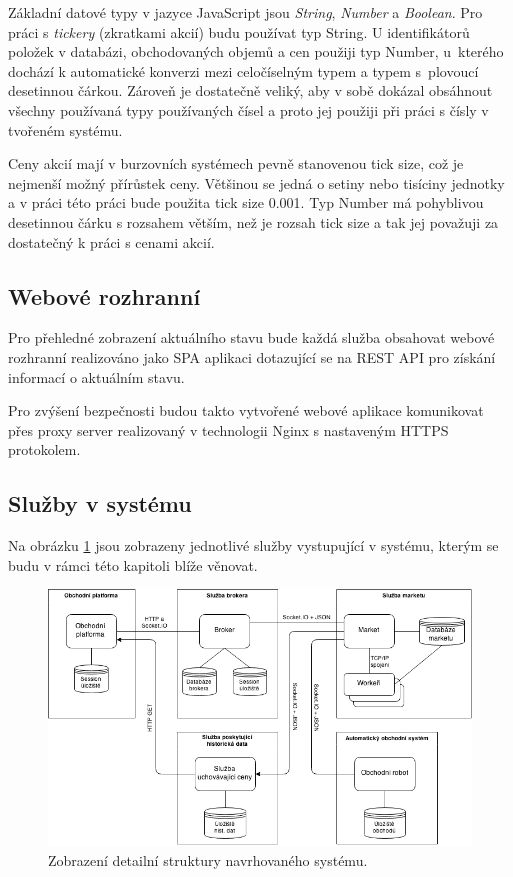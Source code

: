 \documentclass[thesis=M,czech]{FITthesis}[2012/06/26]
\begin{document}
	Základní datové typy v jazyce JavaScript jsou \textit{String}, \textit{Number} a \textit{Boolean}. Pro práci s \textit{tickery} (zkratkami akcií) budu používat typ String. U identifikátorů položek v databázi, obchodovaných objemů a cen použiji typ Number, u~kterého dochází k automatické konverzi mezi celočíselným typem a typem s~plovoucí desetinnou čárkou. Zároveň je dostatečně veliký, aby v sobě dokázal obsáhnout všechny používaná typy používaných čísel a proto jej použiji při práci s čísly v tvořeném systému.
	
	Ceny akcií mají v burzovních systémech pevně stanovenou tick size, což je nejmenší možný přírůstek ceny. Většinou se jedná o setiny nebo tisíciny jednotky a v práci této práci bude použita tick size 0.001. Typ Number má pohyblivou desetinnou čárku s rozsahem větším, než je rozsah tick size a tak jej považuji za dostatečný k práci s cenami akcií.

\subsection{Webové rozhranní}
	
	Pro přehledné zobrazení aktuálního stavu bude každá služba obsahovat webové rozhranní realizováno jako SPA aplikaci dotazující se na REST API pro získání informací o aktuálním stavu.
	
	Pro zvýšení bezpečnosti budou takto vytvořené webové aplikace komunikovat přes proxy server realizovaný v technologii Nginx s nastaveným HTTPS protokolem.

\subsection{Služby v systému}
\label{sec:system_structure}

	Na obrázku \ref{fig:system_structure} jsou zobrazeny jednotlivé služby vystupující v systému, kterým se budu v rámci této kapitoli blíže věnovat.
	
\begin{figure}[h]
	\centering
	\includegraphics[width=1\textwidth]{images/detail_structure}
 	\caption[Detailní pohled na strukturu systému]{Zobrazení detailní struktury navrhovaného systému.}
 	\label{fig:system_structure}
\end{figure}
\end{document}
